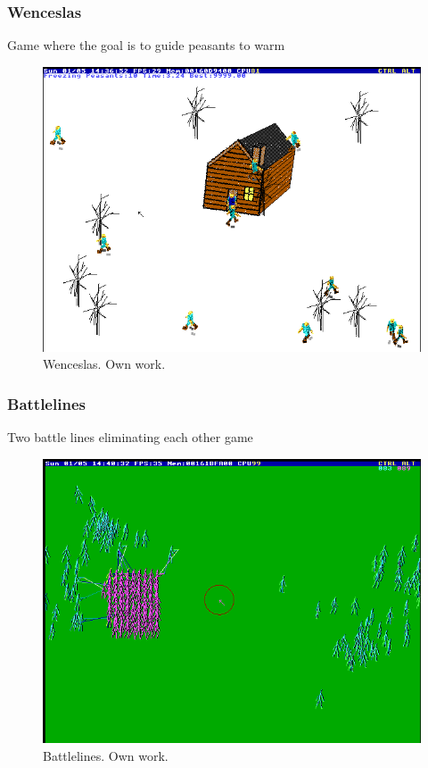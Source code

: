 \documentclass{beamer}
\begin{document}
	\begin{frame}
		\frametitle{Wenceslas}
		Game where the goal is to guide peasants to warm
		\begin{figure}
			\centering
			\includegraphics[width=0.6\linewidth]{images/wenceslas.png}
			\caption{Wenceslas. Own work.}
			\label{fig:wenceslas}
		\end{figure}
	\end{frame}

	\begin{frame}
		\frametitle{Battlelines}
		Two battle lines eliminating each other game
		\begin{figure}
			\centering
			\includegraphics[width=0.6\linewidth]{images/battle_lines.png}
			\caption{Battlelines. Own work.}
			\label{fig:ebattle_lines}
		\end{figure}
	\end{frame}
\end{document}
